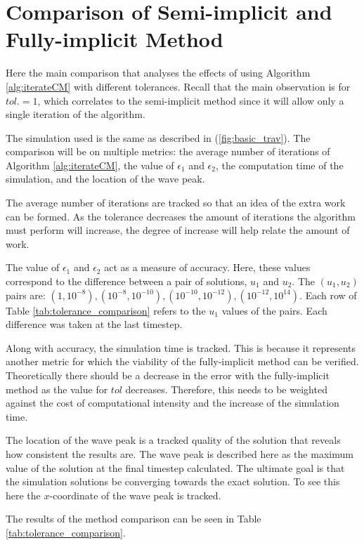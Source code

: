 \section{Comparison of Semi-implicit and Fully-implicit Method}
  Here the main comparison that analyses the effects of using Algorithm \ref{alg:iterateCM} with different tolerances. 
  Recall that the main observation is for $tol. = 1$, which correlates to the semi-implicit method since it will allow only a single iteration of the algorithm. 

  The simulation used is the same as described in (\ref{fig:basic_trav}).
  The comparison will be on multiple metrics: the average number of iterations of Algorithm \ref{alg:iterateCM}, the value of $\epsilon_1$ and $\epsilon_2$, the computation time of the simulation, and the location of the wave peak.

  The average number of iterations are tracked so that an idea of the extra work can be formed.
  As the tolerance decreases the amount of iterations the algorithm must perform will increase, the degree of increase will help relate the amount of work.

  The value of $\epsilon_1$ and $\epsilon_2$ act as a measure of accuracy.
  Here, these values correspond to the difference between a pair of solutions, $u_1$ and $u_2$.
  The $(u_1, u_2)$ pairs are: $(1, 10^{-8}), (10^{-8}, 10^{-10}), (10^{-10}, 10^{-12}), (10^{-12}, 10^{14})$.
  Each row of Table \ref{tab:tolerance_comparison} refers to the $u_1$ values of the pairs.
  Each difference was taken at the last timestep.

  Along with accuracy, the simulation time is tracked.
  This is because it represents another metric for which the viability of the fully-implicit method can be verified.
  Theoretically there should be a decrease in the error with the fully-implicit method as the value for $tol$ decreases.
  Therefore, this needs to be weighted against the cost of computational intensity and the increase of the simulation time.

  The location of the wave peak is a tracked quality of the solution that reveals how consistent the results are.
  The wave peak is described here as the maximum value of the solution at the final timestep calculated.
  The ultimate goal is that the simulation solutions be converging towards the exact solution.
  To see this here the $x$-coordinate of the wave peak is tracked.

  The results of the method comparison can be seen in Table \ref{tab:tolerance_comparison}.
  

